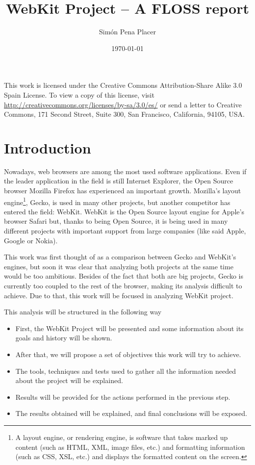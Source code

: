 \documentclass[12pt]{article}
\title{WebKit Project -- A FLOSS report}
\author{Sim\'on Pena Placer}
\date{\today}
\begin{document}
\maketitle
\tableofcontents
\newpage
\mbox{}\vfill
This work is licensed under the Creative Commons Attribution-Share Alike 3.0 Spain License. To view a copy of this license, visit \url{http://creativecommons.org/licenses/by-sa/3.0/es/} or send a letter to Creative Commons, 171 Second Street, Suite 300, San Francisco, California, 94105, USA.
\newpage

\section{Introduction}
\nocite{webkit:home}

Nowadays, web browsers are among the most used software applications. Even if the leader application in the field is still Internet Explorer, the Open Source browser Mozilla Firefox has experienced an important growth\cite{wiki:browser_usage}. Mozilla's layout engine\footnote{A layout engine, or rendering engine, is software that takes marked up content (such as HTML, XML, image files, etc.) and formatting information (such as CSS, XSL, etc.) and displays the formatted content on the screen.}, Gecko, is used in many other projects, but another competitor has entered the field: WebKit. WebKit is the Open Source layout engine for Apple's browser Safari but, thanks to being Open Source, it is being used in many different projects with important support from large companies (like said Apple, Google or Nokia).

This work was first thought of as a comparison between Gecko and WebKit's engines, but soon it was clear that analyzing both projects at the same time would be too ambitious. Besides of the fact that both are big projects, Gecko is currently too coupled to the rest of the browser, making its analysis difficult to achieve. Due to that, this work will be focused in analyzing WebKit project. 

This analysis will be structured in the following way
\begin{itemize}
\item First, the WebKit Project will be presented and some information about its goals and history will be shown. 
\item After that, we will propose a set of objectives this work will try to achieve.
\item The tools, techniques and tests used to gather all the information needed about the project will be explained. 
\item Results will be provided for the actions performed in the previous step.
\item The results obtained will be explained, and final conclusions will be exposed.
\end{itemize}
\end{document}
